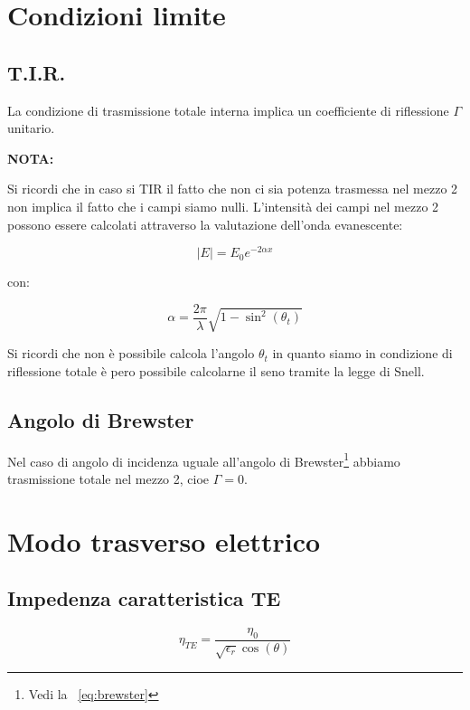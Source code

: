 \documentclass[10pt,a4paper]{report}
\begin{document}
	\section{Condizioni limite}

		\subsection{T.I.R.}
			La condizione di trasmissione totale interna implica un coefficiente di riflessione $\Gamma$ unitario.

			\textbf{NOTA:}

			Si ricordi che in caso si TIR il fatto che non ci sia potenza trasmessa nel mezzo 2 non implica il fatto che i campi siamo nulli.
			L'intensità dei campi nel mezzo 2 possono essere calcolati attraverso la valutazione dell'onda evanescente:


		\begin{equation}
		|E|=E_0 e^{-2 \alpha x}
		\end{equation}

		con:

		\begin{equation}
		\alpha= \frac{2 \pi}{\lambda}\sqrt{1-\sin^2(\theta_t)}
		\end{equation}
		
		Si ricordi che non è possibile calcola l'angolo $\theta_t$ in quanto siamo in condizione di riflessione totale è pero possibile calcolarne il seno tramite la legge di Snell.


		\subsection{Angolo di Brewster}

			Nel caso di angolo di incidenza uguale all'angolo di Brewster\footnote{Vedi la ~\ref{eq:brewster}} abbiamo trasmissione totale nel mezzo 2, cioe $\Gamma=0$.

	\section{Modo trasverso elettrico}

		\subsection{Impedenza caratteristica TE}
			\begin{equation}
			\eta_{TE}=\frac{\eta_0}{\sqrt{\epsilon_r}\cos(\theta)}
			\end{equation}
\end{document}
